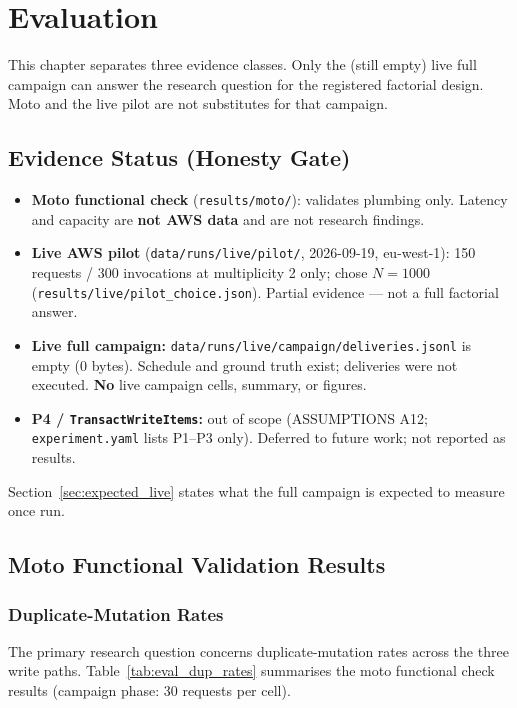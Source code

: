 \chapter{Evaluation}

This chapter separates three evidence classes. Only the (still empty) live full campaign can answer the research question for the registered factorial design. Moto and the live pilot are not substitutes for that campaign.

\section{Evidence Status (Honesty Gate)}

\begin{itemize}
    \item \textbf{Moto functional check} (\texttt{results/moto/}): validates plumbing only. Latency and capacity are \textbf{not AWS data} and are not research findings.
    \item \textbf{Live AWS pilot} (\texttt{data/runs/live/pilot/}, 2026-09-19, eu-west-1): 150 requests / 300 invocations at multiplicity 2 only; chose $N=1000$ (\texttt{results/live/pilot\_choice.json}). Partial evidence --- not a full factorial answer.
    \item \textbf{Live full campaign:} \texttt{data/runs/live/campaign/deliveries.jsonl} is empty (0 bytes). Schedule and ground truth exist; deliveries were not executed. \textbf{No} live campaign cells, summary, or figures.
    \item \textbf{P4 / \texttt{TransactWriteItems}:} out of scope (ASSUMPTIONS A12; \texttt{experiment.yaml} lists P1--P3 only). Deferred to future work; not reported as results.
\end{itemize}

Section~\ref{sec:expected_live} states what the full campaign is expected to measure once run.

\section{Moto Functional Validation Results}

\subsection{Duplicate-Mutation Rates}

The primary research question concerns duplicate-mutation rates across the three write paths. Table~\ref{tab:eval_dup_rates} summarises the moto functional check results (campaign phase: 30 requests per cell).

